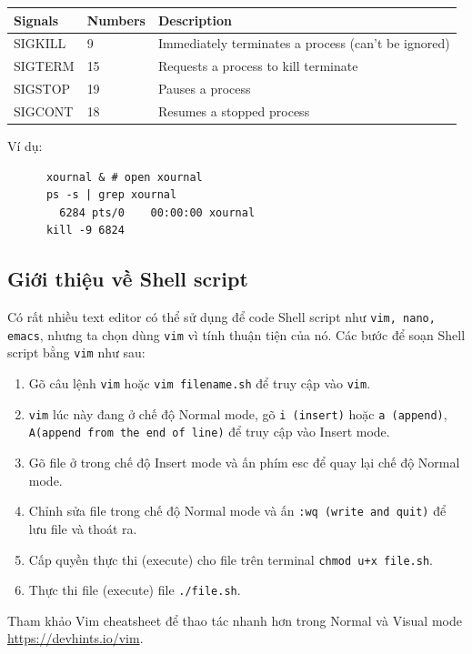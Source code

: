 \documentclass{article}
\begin{document}
\begin{itemize}
\begin{center}
\begin{tabular}{|l | l| l|}
          \hline
          Signals & Numbers & Description \\
          \hline
          SIGKILL & 9 & Immediately terminates a process (can't be ignored) \\
          \hline
          SIGTERM & 15 & Requests a process to kill terminate \\
          \hline
          SIGSTOP & 19 & Pauses a process \\
          \hline
          SIGCONT & 18   &Resumes a stopped process \\
          \hline
        \end{tabular}
      \end{center}
    \end{itemize}
    Ví dụ:
    \begin{center}
    \begin{verbatim}
      xournal & # open xournal
      ps -s | grep xournal
        6284 pts/0    00:00:00 xournal
      kill -9 6824
    \end{verbatim}
    \end{center}
\subsection{Giới thiệu về Shell script}
Có rất nhiều text editor có thể sử dụng để code Shell script như \verb|vim, nano, emacs|, nhưng ta chọn dùng \verb|vim| vì tính thuận tiện của nó.
Các bước để soạn Shell script bằng \verb|vim| như sau:
\begin{enumerate}
  \item Gõ câu lệnh \verb|vim| hoặc \verb|vim filename.sh| để truy cập vào \verb|vim|.
  \item \verb|vim| lúc này đang ở chế độ Normal mode, gõ \verb|i (insert)| hoặc \verb|a (append)|,
  \\ \verb|A(append from the end of line)| để truy cập vào Insert mode.
  \item Gõ file ở trong chế độ Insert mode và ấn phím esc để quay lại chế độ Normal mode.
  \item Chỉnh sửa file trong chế độ Normal mode và ấn \verb|:wq (write and quit)| để lưu file và thoát ra.
  \item Cấp quyền thực thi (execute) cho file trên terminal \verb|chmod u+x file.sh|.
  \item Thực thi file (execute) file \verb|./file.sh|.
\end{enumerate}
Tham khảo Vim cheatsheet để thao tác nhanh hơn trong Normal và Visual mode \url{https://devhints.io/vim}.
\end{document}

